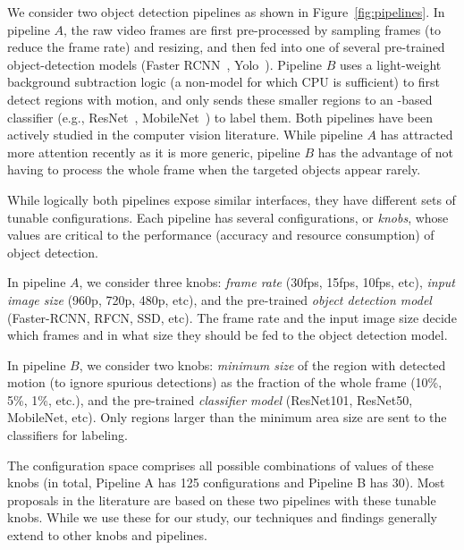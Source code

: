 We consider two object detection pipelines as shown in 
Figure~\ref{fig:pipelines}. 
In pipeline $A$, the raw video frames are first pre-processed by sampling
frames (to reduce the frame rate) and resizing, and then fed into one of several pre-trained object-detection models
(\eg Faster RCNN~\cite{faster-rcnn}, Yolo~\cite{yolo}). 
Pipeline $B$ uses a light-weight background subtraction logic (a 
non-\nn model for which CPU is sufficient) to first detect regions with motion, and only sends these smaller regions to an
\nn-based classifier 
(e.g., ResNet~\cite{resnet}, MobileNet~\cite{mobilenets}) to label them.
Both pipelines have been actively studied in the computer vision 
literature.
While pipeline $A$ has attracted more attention recently as it is more 
generic, pipeline $B$ has the advantage of not having to process 
the whole frame when the targeted objects appear rarely. 

 While logically both pipelines expose similar interfaces, they
have different sets of tunable configurations. Each pipeline has several configurations, or {\em knobs},
whose values are critical to the performance (accuracy and resource
consumption) of object detection. 
\begin{packeditemize}
\item 
In pipeline $A$, we consider three knobs: 
{\em frame rate} (30fps, 15fps, 10fps, etc), 
{\em input image size} (960p, 720p, 480p, etc), and 
the pre-trained {\em object detection model} 
(Faster-RCNN, RFCN, SSD, etc). 
The frame rate and the input image size decide which 
frames and in what size they should be fed to the object detection model.
\item 
In pipeline $B$, we consider two knobs: 
{\em minimum size} of the region with detected motion (to ignore spurious detections) as the fraction of the
whole frame (10\%, 5\%, 1\%, etc.), and 
the pre-trained {\em classifier model} (ResNet101, ResNet50,
MobileNet, etc).
Only regions larger than the minimum area size are 
sent to the classifiers for labeling.
\end{packeditemize}

The configuration space comprises all possible
combinations of values of these knobs (in total, Pipeline A has 125 configurations and Pipeline B has 30). 
Most proposals in the literature are based on these two pipelines with
these tunable knobs. While we use these for our study, our techniques and findings generally extend to other knobs and pipelines.

